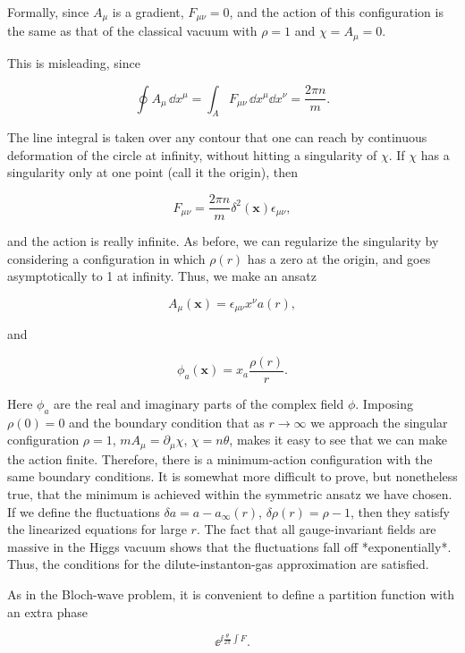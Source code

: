 Formally, since $A_\mu$ is a gradient, $F_{\mu\nu}=0$, and the action of this
configuration is the same as that of the classical vacuum with $\rho=1$ and
$\chi=A_\mu=0$.

This is misleading, since

\[
  \oint A_\mu\,\dd x^\mu=\int_A F_{\mu\nu}\,\dd x^\mu\dd x^\nu
  =\frac{2\pi n}{m}.
\]

The line integral is taken over any contour that one can reach by continuous
deformation of the circle at infinity, without hitting a singularity of $\chi$.
If $\chi$ has a singularity only at one point (call it the origin), then

\[
  F_{\mu\nu}=\frac{2\pi n}{m}\delta^2(\mathbf x)\epsilon_{\mu\nu},
\]

and the action is really infinite. As before, we can regularize the singularity
by considering a configuration in which $\rho(r)$ has a zero at the origin, and
goes asymptotically to 1 at infinity. Thus, we make an ansatz

\[
  A_\mu(\mathbf x)=\epsilon_{\mu\nu}x^\nu a(r),
\]

and

\[
  \phi_a(\mathbf x)=x_a\frac{\rho(r)}{r}.
\]

Here $\phi_a$ are the real and imaginary parts of the complex field $\phi$.
Imposing $\rho(0)=0$ and the boundary condition that as $r\to\infty$ we
approach the singular configuration $\rho=1$, $mA_\mu=\partial_\mu\chi$,
$\chi=n\theta$, makes it easy to see that we can make the action finite.
Therefore, there is a minimum-action configuration with the same boundary
conditions. It is somewhat more difficult to prove, but nonetheless true, that
the minimum is achieved within the symmetric ansatz we have chosen. If we define
the fluctuations $\delta a=a-a_\infty(r)$,
$\delta\rho(r)=\rho-1$, then they satisfy the linearized equations for large
$r$. The fact that all gauge-invariant fields are massive in the Higgs vacuum
shows that the fluctuations fall off *exponentially*. Thus, the conditions for
the dilute-instanton-gas approximation are satisfied.

As in the Bloch-wave problem, it is convenient to define a partition function
with an extra phase

\[
  \ee^{\ii\frac{\theta}{2\pi}\int F}.
\]

